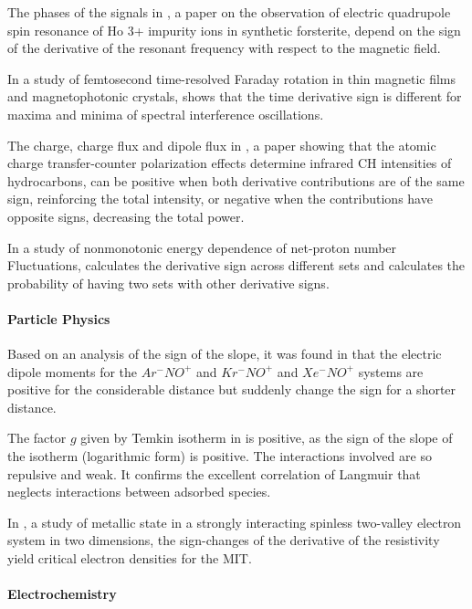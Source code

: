 \documentclass[11pt]{book}
\begin{document}
The phases of the signals in \cite{tarasov2011observation}, a paper on the observation of electric quadrupole spin resonance of
Ho 3+ impurity ions in synthetic forsterite, depend
on the sign of the derivative of the resonant frequency with respect
to the magnetic field.

In a study of femtosecond time-resolved Faraday rotation in thin magnetic
films and magnetophotonic crystals, \cite{chetvertukhin2012femtosecond} shows that the time derivative sign is
different for maxima and minima of spectral interference oscillations.

The charge, charge flux and dipole flux in \cite{silva2014atomic}, a paper showing that the atomic charge transfer-counter polarization effects determine
infrared CH intensities of hydrocarbons,
can be positive when both derivative contributions are of the same
sign, reinforcing the total intensity, or negative when the contributions
have opposite signs, decreasing the total power.

In a study of nonmonotonic energy dependence of net-proton number Fluctuations, \cite{adam2021nonmonotonic} calculates the derivative sign across
different sets and calculates the probability of having two sets with
other derivative signs.


\paragraph{Particle Physics}

Based on an analysis of the sign of the slope, it was found in \cite{orek2016ab}
that the electric dipole moments for the $Ar^{-}NO^{+}$ and $Kr^{-}NO^{+}$
and $Xe^{-}NO^{+}$ systems are positive for the considerable distance
but suddenly change the sign for a shorter distance.

The factor $g$ given by Temkin isotherm in \cite{abidar2016orthophosphate}
is positive, as the sign of the slope of the isotherm (logarithmic
form) is positive. The interactions involved are so repulsive and
weak. It confirms the excellent correlation of Langmuir that neglects
interactions between adsorbed species.

In \cite{melnikov2020metallic}, a study of metallic state in a strongly interacting spinless two-valley electron
system in two dimensions, the sign-changes of the derivative
of the resistivity yield critical electron densities for the MIT.


\paragraph{Electrochemistry}
\end{document}
